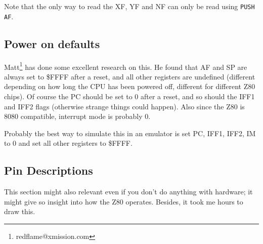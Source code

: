 \documentclass[twoside,openright,a4paper]{book}
\begin{document}
Note that the only way to read the XF, YF and NF can only be read using
{\tt PUSH AF}.


\subsection{Power on defaults}
\label{pon}

Matt\footnote{redflame@xmission.com} has done some excellent research on this. He found that AF and SP are always set to \$FFFF after a reset, and all other registers are undefined (different depending on how long the CPU has been powered off, different for different Z80 chips). Of course the PC should be set to 0 after a reset, and so should the IFF1 and IFF2 flags (otherwise strange things could happen). Also since the Z80 is 8080 compatible, interrupt mode is probably 0.

Probably the best way to simulate this in an emulator is set PC, IFF1, IFF2, IM to 0 and set all other registers to \$FFFF.


\subsection{Pin Descriptions \cite{datasheet}}

This section might also relevant even if you don't do anything with hardware; it might give so insight into how the Z80 operates. Besides, it took me hours to draw this.
\end{document}
